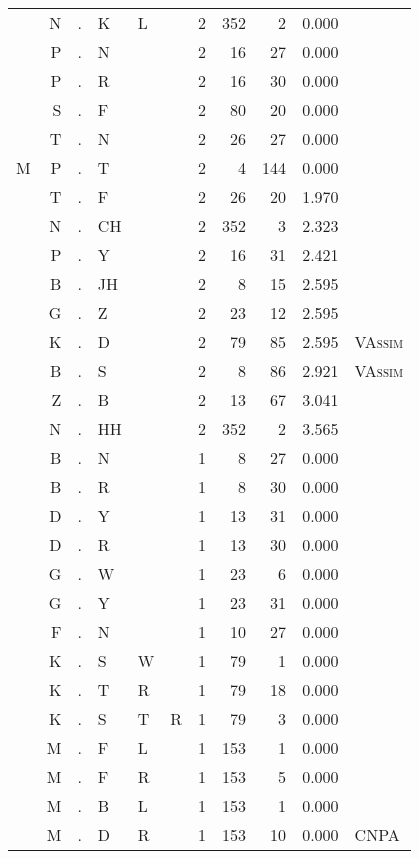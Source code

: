 \begin{longtable}{r@{ } r@{ } c@{ } l@{ } l@{ } l@{ } r r r r l }
  & N & . & K & L &   & 2 & 352 & 2 & 0.000 &  \\
  & P & . & N &   &   & 2 & 16 & 27 & 0.000 &  \\
  & P & . & R &   &   & 2 & 16 & 30 & 0.000 &  \\
  & S & . & F &   &   & 2 & 80 & 20 & 0.000 &  \\
  & T & . & N &   &   & 2 & 26 & 27 & 0.000 &  \\
M & P & . & T &   &   & 2 & 4 & 144 & 0.000 &  \\
  & T & . & F &   &   & 2 & 26 & 20 & 1.970 &  \\
  & N & . & CH &   &   & 2 & 352 & 3 & 2.323 &  \\
  & P & . & Y &   &   & 2 & 16 & 31 & 2.421 &  \\
  & B & . & JH &   &   & 2 & 8 & 15 & 2.595 &  \\
  & G & . & Z &   &   & 2 & 23 & 12 & 2.595 &  \\
  & K & . & D &   &   & 2 & 79 & 85 & 2.595 & \textsc{VAssim} \\
  & B & . & S &   &   & 2 & 8 & 86 & 2.921 & \textsc{VAssim} \\
  & Z & . & B &   &   & 2 & 13 & 67 & 3.041 &  \\
  & N & . & HH &   &   & 2 & 352 & 2 & 3.565 &  \\
  & B & . & N &   &   & 1 & 8 & 27 & 0.000 &  \\
  & B & . & R &   &   & 1 & 8 & 30 & 0.000 &  \\
  & D & . & Y &   &   & 1 & 13 & 31 & 0.000 &  \\
  & D & . & R &   &   & 1 & 13 & 30 & 0.000 &  \\
  & G & . & W &   &   & 1 & 23 & 6 & 0.000 &  \\
  & G & . & Y &   &   & 1 & 23 & 31 & 0.000 &  \\
  & F & . & N &   &   & 1 & 10 & 27 & 0.000 &  \\
  & K & . & S & W &   & 1 & 79 & 1 & 0.000 &  \\
  & K & . & T & R &   & 1 & 79 & 18 & 0.000 &  \\
  & K & . & S & T & R & 1 & 79 & 3 & 0.000 &  \\
  & M & . & F & L &   & 1 & 153 & 1 & 0.000 &  \\
  & M & . & F & R &   & 1 & 153 & 5 & 0.000 &  \\
  & M & . & B & L &   & 1 & 153 & 1 & 0.000 &  \\
  & M & . & D & R &   & 1 & 153 & 10 & 0.000 & \textsc{CNPA} \\

\end{longtable}
